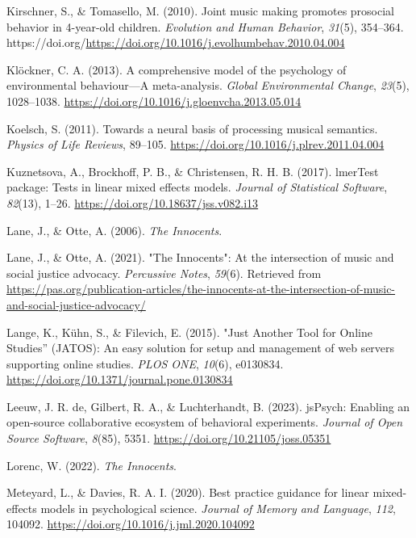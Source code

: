 \documentclass[
  man,floatsintext]{apa6}
\newlength{\cslhangindent}
\newenvironment{CSLReferences}[2] %
 {\begin{list}{}{%
  \setlength{\itemindent}{0pt}
  \setlength{\leftmargin}{0pt}
  \setlength{\parsep}{0pt}
  \ifodd #1
   \setlength{\leftmargin}{\cslhangindent}
   \setlength{\itemindent}{-1\cslhangindent}
  \fi
  \setlength{\itemsep}{#2\baselineskip}}}
 {\end{list}}
\begin{document}
\begin{CSLReferences}{1}{0}
Kirschner, S., \& Tomasello, M. (2010). Joint music making promotes prosocial behavior in 4-year-old children. \emph{Evolution and Human Behavior}, \emph{31}(5), 354--364. https://doi.org/\url{https://doi.org/10.1016/j.evolhumbehav.2010.04.004}

Klöckner, C. A. (2013). A comprehensive model of the psychology of environmental behaviour---{A} meta-analysis. \emph{Global Environmental Change}, \emph{23}(5), 1028--1038. \url{https://doi.org/10.1016/j.gloenvcha.2013.05.014}

Koelsch, S. (2011). Towards a neural basis of processing musical semantics. \emph{Physics of Life Reviews}, 89--105. \url{https://doi.org/10.1016/j.plrev.2011.04.004}

Kuznetsova, A., Brockhoff, P. B., \& Christensen, R. H. B. (2017). {lmerTest} package: Tests in linear mixed effects models. \emph{Journal of Statistical Software}, \emph{82}(13), 1--26. \url{https://doi.org/10.18637/jss.v082.i13}

Lane, J., \& Otte, A. (2006). \emph{The {Innocents}}.

Lane, J., \& Otte, A. (2021). "{The} {Innocents}": {At} the intersection of music and social justice advocacy. \emph{Percussive Notes}, \emph{59}(6). Retrieved from \url{https://pas.org/publication-articles/the-innocents-at-the-intersection-of-music-and-social-justice-advocacy/}

Lange, K., Kühn, S., \& Filevich, E. (2015). "{Just} {Another} {Tool} for {Online} {Studies}'' ({JATOS}): {An} easy solution for setup and management of web servers supporting online studies. \emph{PLOS ONE}, \emph{10}(6), e0130834. \url{https://doi.org/10.1371/journal.pone.0130834}

Leeuw, J. R. de, Gilbert, R. A., \& Luchterhandt, B. (2023). {jsPsych}: {Enabling} an open-source collaborative ecosystem of behavioral experiments. \emph{Journal of Open Source Software}, \emph{8}(85), 5351. \url{https://doi.org/10.21105/joss.05351}

Lorenc, W. (2022). \emph{The {Innocents}}.

Meteyard, L., \& Davies, R. A. I. (2020). Best practice guidance for linear mixed-effects models in psychological science. \emph{Journal of Memory and Language}, \emph{112}, 104092. \url{https://doi.org/10.1016/j.jml.2020.104092}


\end{CSLReferences}
\end{document}
